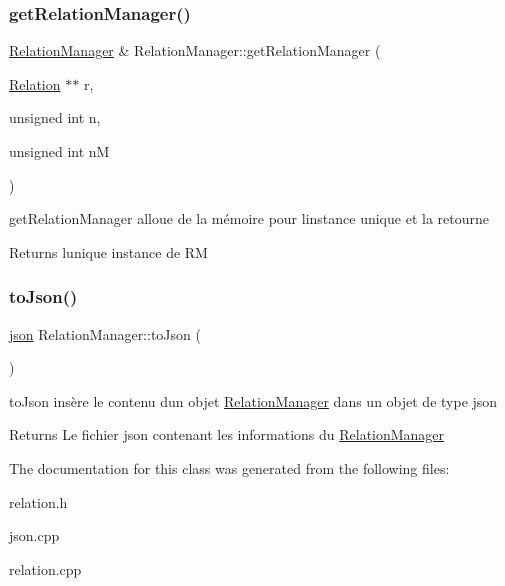 \subsubsection{\texorpdfstring{get\+Relation\+Manager()}{getRelationManager()}}
{\footnotesize\ttfamily \hyperlink{classRelationManager}{Relation\+Manager} \& Relation\+Manager\+::get\+Relation\+Manager (\begin{DoxyParamCaption}\item[{\hyperlink{classRelation}{Relation} $\ast$$\ast$}]{r,  }\item[{unsigned int}]{n,  }\item[{unsigned int}]{nM }\end{DoxyParamCaption})\hspace{0.3cm}{\ttfamily [static]}}



get\+Relation\+Manager alloue de la mémoire pour l\textquotesingle{}instance unique et la retourne 

\begin{DoxyReturn}{Returns}
l\textquotesingle{}unique instance de RM 
\end{DoxyReturn}
\mbox{\label{classRelationManager_a18ec52e110ddb59a526a8fdbbb1b8d7a}} 
\subsubsection{\texorpdfstring{to\+Json()}{toJson()}}
{\footnotesize\ttfamily \hyperlink{classnlohmann_1_1basic__json}{json} Relation\+Manager\+::to\+Json (\begin{DoxyParamCaption}{ }\end{DoxyParamCaption})}



to\+Json insère le contenu d\textquotesingle{}un objet \hyperlink{classRelationManager}{Relation\+Manager} dans un objet de type json 

\begin{DoxyReturn}{Returns}
Le fichier json contenant les informations du \hyperlink{classRelationManager}{Relation\+Manager} 
\end{DoxyReturn}


The documentation for this class was generated from the following files\+:\begin{DoxyCompactItemize}
\item 
relation.\+h\item 
json.\+cpp\item 
relation.\+cpp\end{DoxyCompactItemize}
